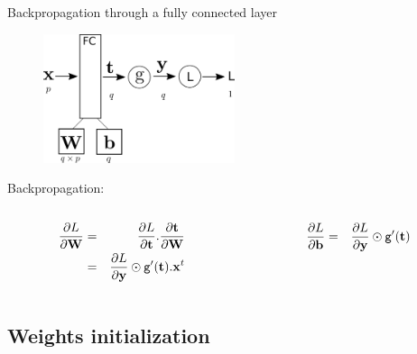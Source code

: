 \documentclass[handout,xcolor=pdftex,dvipsnames,table,mathserif]{beamer}
\begin{document}
\begin{frame}{Backpropagation through a fully connected layer}
  \begin{figure}
    \includegraphics[width=0.5\textwidth]{bp_fc.png}
  \end{figure}

  Backpropagation:
  \begin{columns}
    \begin{column}{.5\textwidth}
      \begin{eqnarray*}
        \pdv{L}{\mathbf{W}} &=& \pdv{L}{\mathbf{t}}.\pdv{\mathbf{t}}{\mathbf{W}} \\
                   &=& \pdv{L}{\mathbf{y}} \odot \texttt{g}'(\mathbf{t}).\mathbf{x}^t
      \end{eqnarray*}
    \end{column}

  \begin{column}{.5\textwidth}
  \begin{eqnarray*}
    \pdv{L}{\mathbf{b}} &=&  \pdv{L}{\mathbf{y}} \odot \texttt{g}'(\mathbf{t})
  \end{eqnarray*}
  \end{column}
\end{columns}


\end{frame}


\subsection{Weights initialization}
\end{document}

